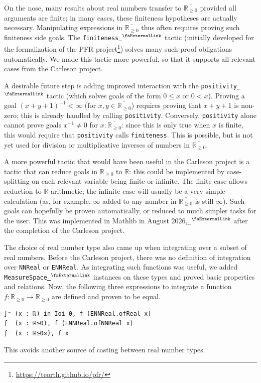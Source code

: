 \documentclass[12pt, reqno]{amsart}
\newcounter{lstlisting}[section]
\let\lean\lstinline
\newcommand*{\real}{\mathbb{R}} %
\newcommand{\ennreal}{\overline{\real_{\ge0}}}
\newcommand{\extlink}{~\ensuremath{{}^\text{\faExternalLink}}}
\theoremstyle{definition}
\theoremstyle{plain}
\begin{document}
On the nose, many results about real numbers transfer to $\ennreal$ provided all arguments are finite; in many cases, these finiteness hypotheses are actually necessary. Manipulating expressions in $\ennreal$ thus often requires proving such finiteness side goals. The \lean{finiteness}\href{https://github.com/leanprover-community/mathlib4/blob/b63493a4746b4651fceb3bcf3a4651cc36a4b8de/Mathlib/Tactic/Finiteness.lean#L73}{\extlink} tactic (initially developed for the formalization of the PFR project\footnote{\url{https://teorth.github.io/pfr/}}) solves many such proof obligations automatically. We made this tactic more powerful, so that it supports all relevant cases from the Carleson project.

A desirable future step is adding improved interaction with the \lean{positivity}\href{https://github.com/leanprover-community/mathlib4/blob/b63493a4746b4651fceb3bcf3a4651cc36a4b8de/Mathlib/Tactic/Positivity/Core.lean#L593}{\extlink} tactic (which solves goals of the form \texttt{$0 \leq x$} or \texttt{$0 < x$}). Proving a goal \texttt{$(x + y + 1)^{-1}<\infty$} (for $x,y\in\ennreal$) requires proving that $x + y + 1$ is non-zero; this is already handled by calling \lean{positivity}. Conversely, \lean{positivity} alone cannot prove goals \texttt{$x^{-1}\neq 0$} for $x\colon\ennreal$: since this is only true when $x$ is finite, this would require that \lean{positivity} calls \lean{finiteness}. This is possible, but is not yet used for division or multiplicative inverses of numbers in $\ennreal$.

A more powerful tactic that would have been useful in the Carleson project is a tactic that can reduce goals in $\ennreal$ to $\real$: this could be implemented by case-splitting on each relevant variable being finite or infinite. The finite case allows reduction to $\real$ arithmetic; the infinite case will usually be a very simple calculation (as, for example, $\infty$ added to any number in $\ennreal$ is still $\infty$). Such goals can hopefully be proven automatically, or reduced to much simpler tasks for the user.
This was implemented in Mathlib in August 2026,\href{https://github.com/leanprover-community/mathlib4/pull/43254}{\extlink} after the completion of the Carleson project.

The choice of real number type also came up when integrating over a subset of real numbers. Before the Carleson project, there was no definition of integration over \lean{NNReal} or \lean{ENNReal}. As integrating such functions was useful, we added \lean{MeasureSpace}\href{https://github.com/leanprover-community/mathlib4/blob/b63493a4746b4651fceb3bcf3a4651cc36a4b8de/Mathlib/MeasureTheory/Measure/MeasureSpaceDef.lean#L355-L356}{\extlink} instances on these types and proved basic properties and relations. Now, the following three expressions to integrate a function $f : \ennreal\to \ennreal$ are defined and proven to be equal.
\begin{lstlisting}[mathescape]
∫⁻ (x : ℝ) in Ioi 0, f (ENNReal.ofReal x)
∫⁻ (x : ℝ≥0), f (ENNReal.ofNNReal x)
∫⁻ (x : ℝ≥0∞), f x
\end{lstlisting}
This avoids another source of casting between real number types.
\end{document}
